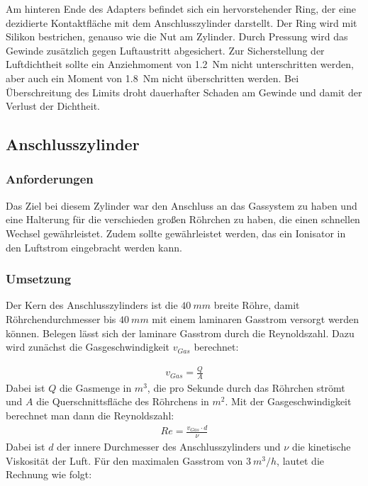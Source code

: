 Am hinteren Ende des Adapters befindet sich ein hervorstehender Ring, der eine dezidierte Kontaktfläche mit dem Anschlusszylinder darstellt. Der Ring wird mit Silikon bestrichen, genauso wie die Nut am Zylinder. Durch Pressung wird das Gewinde zusätzlich gegen Luftaustritt abgesichert. Zur Sicherstellung der Luftdichtheit sollte ein Anziehmoment von \SI{1,2}{Nm} nicht unterschritten werden, aber auch ein Moment von \SI{1,8}{Nm} nicht überschritten werden. Bei Überschreitung des Limits droht dauerhafter Schaden am Gewinde und damit der Verlust der Dichtheit.


\newpage

\subsection{Anschlusszylinder}

\subsubsection{Anforderungen}

Das Ziel bei diesem Zylinder war den Anschluss an das Gassystem zu haben und eine Halterung für die verschieden großen Röhrchen zu haben, die einen schnellen Wechsel gewährleistet. Zudem sollte gewährleistet werden, das ein Ionisator in den Luftstrom eingebracht werden kann.


\subsubsection{Umsetzung}

Der Kern des Anschlusszylinders ist die $\SI{40}{mm}$ breite Röhre, damit Röhrchendurchmesser bis $\SI{40}{mm}$ mit einem laminaren Gasstrom versorgt werden können. Belegen lässt sich der laminare Gasstrom durch die Reynoldszahl. Dazu wird zunächst die Gasgeschwindigkeit $v_{Gas}$ berechnet:

\begin{align*}
v_{Gas} = \frac{Q}{A}
\end{align*}
Dabei ist $Q$ die Gasmenge in $m^3$, die pro Sekunde durch das Röhrchen strömt und $A$ die Querschnittsfläche des Röhrchens in $m^2$. Mit der Gasgeschwindigkeit berechnet man dann die Reynoldszahl:
\begin{align*}
Re = \frac{v_{Gas} \cdot d}{\nu}
\end{align*} 
Dabei ist $d$ der innere Durchmesser des Anschlusszylinders und $\nu$ die kinetische Viskosität der Luft. Für den maximalen Gasstrom von $\SI{3}{m^3/h}$, lautet die Rechnung wie folgt:

